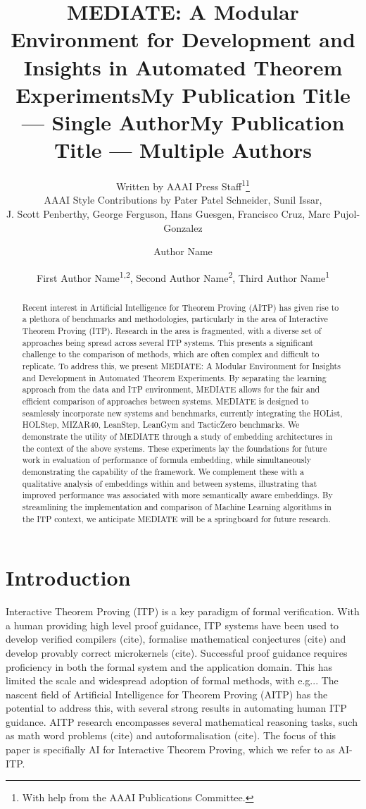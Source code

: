 \documentclass[letterpaper]{article} %
\title{MEDIATE: A Modular Environment for Development and Insights in Automated Theorem Experiments}
\author{
    Written by AAAI Press Staff\textsuperscript{\rm 1}\thanks{With help from the AAAI Publications Committee.}\\
    AAAI Style Contributions by Pater Patel Schneider,
    Sunil Issar,\\
    J. Scott Penberthy,
    George Ferguson,
    Hans Guesgen,
    Francisco Cruz\equalcontrib,
    Marc Pujol-Gonzalez\equalcontrib
}
\title{My Publication Title --- Single Author}
\author {
    Author Name
}
\title{My Publication Title --- Multiple Authors}
\author {
    First Author Name\textsuperscript{\rm 1,\rm 2},
    Second Author Name\textsuperscript{\rm 2},
    Third Author Name\textsuperscript{\rm 1}
}
\begin{document}
\maketitle

\begin{abstract}
    Recent interest in Artificial Intelligence for Theorem Proving (AITP) has given rise to a plethora of benchmarks and
    methodologies,
    particularly in the area of Interactive Theorem Proving (ITP).
    Research in the area is fragmented, with a diverse set of approaches being spread across several ITP systems.
    This presents a significant challenge to the comparison of methods, which are often complex and difficult to replicate.
    To address this, we present MEDIATE: A Modular Environment for Insights and Development in Automated Theorem Experiments.
    By separating the learning approach from the data and ITP environment, MEDIATE allows for the fair and efficient
    comparison of approaches between systems.
    MEDIATE is designed to seamlessly incorporate new systems and benchmarks, currently integrating the HOList, HOLStep,
    MIZAR40, LeanStep, LeanGym and TacticZero benchmarks.
    We demonstrate the utility of MEDIATE through a study of embedding architectures in the context of the above systems.
    These experiments lay the foundations for future work in evaluation of performance of formula embedding,
    while simultaneously demonstrating the capability of the framework.
    We complement these with a qualitative analysis of embeddings within and between systems, illustrating that improved
    performance was associated with more semantically aware embeddings.
    By streamlining the implementation and comparison of Machine Learning algorithms in the ITP context,
    we anticipate MEDIATE will be a springboard for future
    research.

\end{abstract}

\section{Introduction}

Interactive Theorem Proving (ITP) is a key paradigm of formal verification.
With a human providing high level proof guidance, ITP systems have been used to develop verified compilers (cite), formalise mathematical conjectures (cite) and develop provably correct microkernels (cite).
Successful proof guidance requires proficiency in both the formal system and the application domain.
This has limited the scale and widespread adoption of formal methods, with e.g...
The nascent field of Artificial Intelligence for Theorem Proving (AITP) has the potential to address this,
with several strong results in automating human ITP guidance.
AITP research encompasses several mathematical reasoning tasks, such as math word problems (cite) and autoformalisation (cite).
The focus of this paper is specifially AI for Interactive Theorem Proving, which we refer to as AI-ITP.
\end{document}
